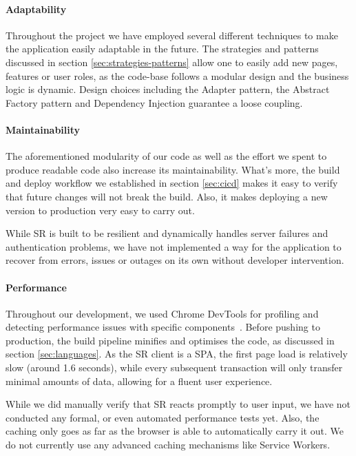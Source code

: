 \documentclass[sigconf]{acmart}
\begin{document}
\paragraph{Adaptability}

Throughout the project we have employed several different techniques to make the application easily adaptable in the future. The strategies and patterns discussed in section \ref{sec:strategies-patterns} allow one to easily add new pages, features or user roles, as the code-base follows a modular design and the business logic is dynamic. Design choices including the Adapter pattern, the Abstract Factory pattern and Dependency Injection guarantee a loose coupling.


\paragraph{Maintainability}

The aforementioned modularity of our code as well as the effort we spent to produce readable code also increase its maintainability. What's more, the build and deploy workflow we established in section \ref{sec:cicd} makes it easy to verify that future changes will not break the build. Also, it makes deploying a new version to production very easy to carry out.

While SR is built to be resilient and dynamically handles server failures and authentication problems, we have not implemented a way for the application to recover from errors, issues or outages on its own without developer intervention.


\paragraph{Performance}

Throughout our development, we used Chrome DevTools for profiling and detecting performance issues with specific components~\cite{react-profiling}. Before pushing to production, the build pipeline minifies and optimises the code, as discussed in section \ref{sec:languages}. As the SR client is a SPA, the first page load is relatively slow (around 1.6 seconds), while every subsequent transaction will only transfer minimal amounts of data, allowing for a fluent user experience.

While we did manually verify that SR reacts promptly to user input, we have not conducted any formal, or even automated performance tests yet. Also, the caching only goes as far as the browser is able to automatically carry it out. We do not currently use any advanced caching mechanisms like Service Workers.
\end{document}
